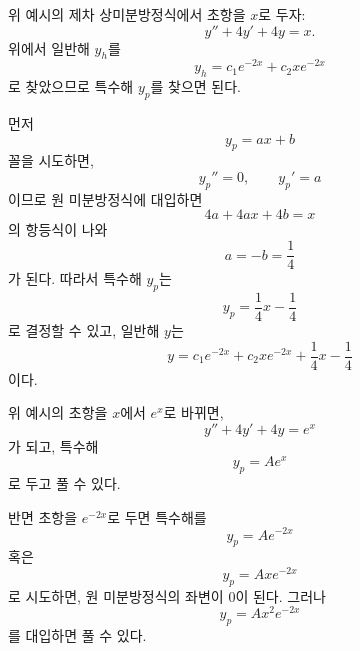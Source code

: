 \documentclass[../engineering_mathematics_lecture_note.tex]{subfiles}
\begin{document}
\begin{example}
    위 예시의 제차 상미분방정식에서 초항을 $x$로 두자:
    \begin{equation*}
        y'' + 4y' + 4y = x.
    \end{equation*}
    위에서 일반해 $y_h$를
    \begin{equation*}
        y_h = c_1 e^{-2x} + c_2 xe^{-2x}
    \end{equation*}
    로 찾았으므로 특수해 $y_p$를 찾으면 된다.

    먼저
    \begin{equation*}
        y_p = ax + b
    \end{equation*}
    꼴을 시도하면,
    \begin{equation*}
        y_p'' = 0,\qquad y_p' = a
    \end{equation*}
    이므로 원 미분방정식에 대입하면
    \begin{equation*}
        4a + 4ax + 4b = x
    \end{equation*}
    의 항등식이 나와
    \begin{equation*}
        a = -b = \frac14
    \end{equation*}
    가 된다.
    따라서 특수해 $y_p$는
    \begin{equation*}
        y_p = \frac14 x - \frac14
    \end{equation*}
    로 결정할 수 있고, 일반해 $y$는
    \begin{equation*}
        y = c_1 e^{-2x} + c_2 xe^{-2x} + \frac14 x - \frac14
    \end{equation*}
    이다.
\end{example}

\begin{example}
    위 예시의 초항을 $x$에서 $e^x$로 바뀌면,
    \begin{equation*}
        y'' + 4y' + 4y = e^x
    \end{equation*}
    가 되고, 특수해
    \begin{equation*}
        y_p = Ae^x
    \end{equation*}
    로 두고 풀 수 있다.

    반면 초항을 $e^{-2x}$로 두면 특수해를
    \begin{equation*}
        y_p = Ae^{-2x}
    \end{equation*}
    혹은
    \begin{equation*}
        y_p = Axe^{-2x}
    \end{equation*}
    로 시도하면, 원 미분방정식의 좌변이 0이 된다.
    그러나
    \begin{equation*}
        y_p = Ax^2 e^{-2x}
    \end{equation*}
    를 대입하면 풀 수 있다.
\end{example}
\end{document}
